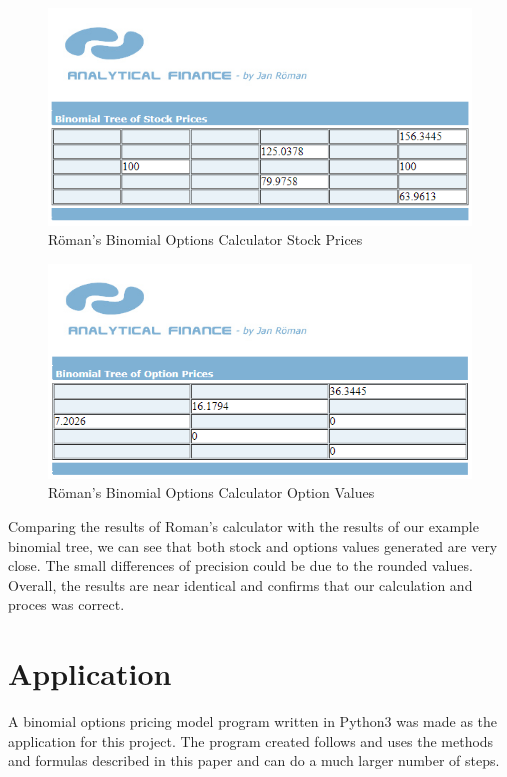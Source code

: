 \documentclass[12pt, letterpaper]{article}\usepackage{float}
\begin{document}
\begin{figure}[H]
  \includegraphics{Roman_binomial_calculator_stock_prices}
  \caption{R\"{o}man's Binomial Options Calculator Stock Prices}
\end{figure}

\begin{figure}[H]
  \includegraphics{Roman_binomial_calculator_option_values}
  \caption{R\"{o}man's Binomial Options Calculator Option Values}
\end{figure}

Comparing the results of Roman's calculator with the results of our example binomial tree, we can see that both stock and options values generated are very close.
The small differences of precision could be due to the rounded values.
Overall, the results are near identical and confirms that our calculation and proces was correct.

\pagebreak

\section*{Application}
A binomial options pricing model program written in Python3 was made as the application for this project.
The program created follows and uses the methods and formulas described in this paper and can do a much larger number of steps.
\end{document}
